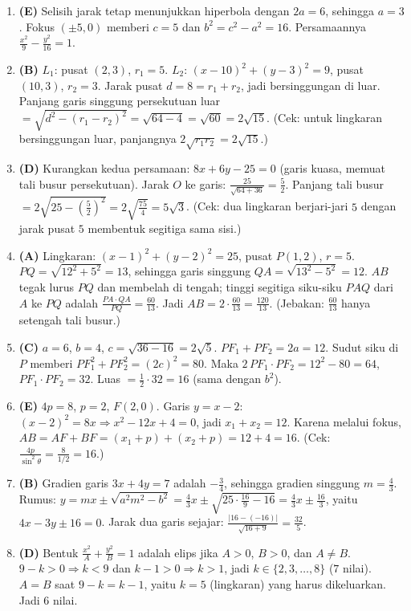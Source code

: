 \documentclass[a4paper,11pt]{article}
\begin{document}
\begin{enumerate}[leftmargin=2em,itemsep=2pt,topsep=2pt]
\item[\textbf{10.}] \textbf{(E)} Selisih jarak tetap menunjukkan hiperbola dengan $2a=6$, sehingga $a=3$. Fokus $(\pm5,0)$ memberi $c=5$ dan $b^2=c^2-a^2=16$. Persamaannya $\frac{x^2}9-\frac{y^2}{16}=1$.
\item[\textbf{11.}] \textbf{(B)} $L_1$: pusat $(2,3)$, $r_1=5$. $L_2$: $(x-10)^2+(y-3)^2=9$, pusat $(10,3)$, $r_2=3$. Jarak pusat $d=8=r_1+r_2$, jadi bersinggungan di luar. Panjang garis singgung persekutuan luar $=\sqrt{d^2-(r_1-r_2)^2}=\sqrt{64-4}=\sqrt{60}=2\sqrt{15}$. (Cek: untuk lingkaran bersinggungan luar, panjangnya $2\sqrt{r_1r_2}=2\sqrt{15}$.)
\item[\textbf{12.}] \textbf{(D)} Kurangkan kedua persamaan: $8x+6y-25=0$ (garis kuasa, memuat tali busur persekutuan). Jarak $O$ ke garis: $\frac{25}{\sqrt{64+36}}=\frac52$. Panjang tali busur $=2\sqrt{25-\left(\frac52\right)^2}=2\sqrt{\frac{75}4}=5\sqrt3$. (Cek: dua lingkaran berjari-jari $5$ dengan jarak pusat $5$ membentuk segitiga sama sisi.)
\item[\textbf{13.}] \textbf{(A)} Lingkaran: $(x-1)^2+(y-2)^2=25$, pusat $P(1,2)$, $r=5$. $PQ=\sqrt{12^2+5^2}=13$, sehingga garis singgung $QA=\sqrt{13^2-5^2}=12$. $AB$ tegak lurus $PQ$ dan membelah di tengah; tinggi segitiga siku-siku $PAQ$ dari $A$ ke $PQ$ adalah $\frac{PA\cdot QA}{PQ}=\frac{60}{13}$. Jadi $AB=2\cdot\frac{60}{13}=\frac{120}{13}$. (Jebakan: $\frac{60}{13}$ hanya setengah tali busur.)
\item[\textbf{14.}] \textbf{(C)} $a=6$, $b=4$, $c=\sqrt{36-16}=2\sqrt5$. $PF_1+PF_2=2a=12$. Sudut siku di $P$ memberi $PF_1^2+PF_2^2=(2c)^2=80$. Maka $2\,PF_1\!\cdot\!PF_2=12^2-80=64$, $PF_1\!\cdot\!PF_2=32$. Luas $=\frac12\cdot32=16$ (sama dengan $b^2$).
\item[\textbf{15.}] \textbf{(E)} $4p=8$, $p=2$, $F(2,0)$. Garis $y=x-2$: $(x-2)^2=8x\Rightarrow x^2-12x+4=0$, jadi $x_1+x_2=12$. Karena melalui fokus, $AB=AF+BF=(x_1+p)+(x_2+p)=12+4=16$. (Cek: $\frac{4p}{\sin^2\theta}=\frac{8}{1/2}=16$.)
\item[\textbf{16.}] \textbf{(B)} Gradien garis $3x+4y=7$ adalah $-\frac34$, sehingga gradien singgung $m=\frac43$. Rumus: $y=mx\pm\sqrt{a^2m^2-b^2}=\frac43x\pm\sqrt{25\cdot\frac{16}9-16}=\frac43x\pm\frac{16}3$, yaitu $4x-3y\pm16=0$. Jarak dua garis sejajar: $\frac{|16-(-16)|}{\sqrt{16+9}}=\frac{32}5$.
\item[\textbf{17.}] \textbf{(D)} Bentuk $\frac{x^2}A+\frac{y^2}B=1$ adalah elips jika $A>0$, $B>0$, dan $A\ne B$. $9-k>0\Rightarrow k<9$ dan $k-1>0\Rightarrow k>1$, jadi $k\in\{2,3,\dots,8\}$ ($7$ nilai). $A=B$ saat $9-k=k-1$, yaitu $k=5$ (lingkaran) yang harus dikeluarkan. Jadi $6$ nilai.

\end{enumerate}
\end{document}
